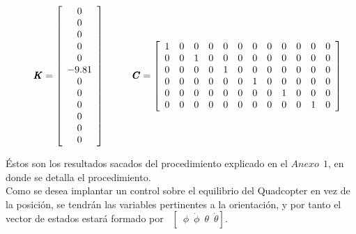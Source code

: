 \documentclass[twoside,11pt]{report}
\begin{document}
\begin{equation}
\hspace*{0.5cm} \pmb{K}= \left[ \begin{array}{c}
0 \\
0 \\
0 \\
0 \\
0 \\
-9.81 \\
0 \\
0 \\
0 \\
0 \\
0 \\
0 \\ \end{array} \right]  \hspace*{1cm} \pmb{C}=\left[ \begin{array}{cccccccccccc}
1 & 0 & 0 & 0 & 0 & 0 & 0 & 0 & 0 & 0 & 0 & 0 \\
0 & 0 & 1 & 0 & 0 & 0 & 0 & 0 & 0 & 0 & 0 & 0 \\
0 & 0 & 0 & 0 & 1 & 0 & 0 & 0 & 0 & 0 & 0 & 0 \\
0 & 0 & 0 & 0 & 0 & 0 & 1 & 0 & 0 & 0 & 0 & 0 \\
0 & 0 & 0 & 0 & 0 & 0 & 0 & 0 & 1 & 0 & 0 & 0 \\
0 & 0 & 0 & 0 & 0 & 0 & 0 & 0 & 0 & 0 & 1 & 0 \\ \end{array} \right]
\end{equation}

Éstos son los resultados sacados del procedimiento explicado en el $Anexo \>\>1$, en donde se detalla el procedimiento.\\

Como se desea implantar un control sobre el equilibrio del Quadcopter en vez de la posición, se tendrán las variables pertinentes a la orientación, y por tanto el vector de estados estará formado por %
$\enspace \left[ \enspace \phi \enspace \dot{\phi} \enspace \theta \enspace \dot{\theta} \right]$. 
\end{document}
